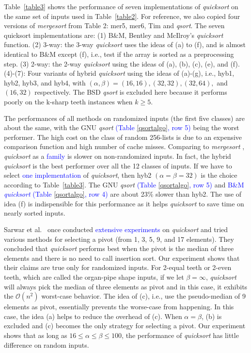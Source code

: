 \documentclass[AMA,STIX1COL]{WileyNJD-v2}
\newcommand{\qusort}{\emph{quicksort }}
\newcommand{\qusortn}{\emph{quicksort}}
\newcommand{\qsort}{\emph{qsort }}
\newcommand{\qsortn}{\emph{qsort}}
\newcommand{\msort}{\emph{mergesort }}
\begin{document}
Table~\ref{table3} shows the performance of seven implementations of \qusort on the same set of inputs used in Table~\ref{table2}. 
For reference, we also copied four versions of \msort from Table 2: mer5, mer6, Tim and \qsortn. 
The seven quicksort implementations are: (1) B\&M, Bentley and McIlroy’s \qusort function. (2) 3-way: the 3-way \qusort uses the ideas of (a) to (f), and is almost identical to B\&M except (f), i.e., test if the array is sorted as a preprocessing step. (3) 2-way: the 2-way \qusort using the ideas of (a), (b), (c), (e), and (f). (4)-(7): Four variants of hybrid \qusort using the ideas of (a)-(g), i.e., hyb1, hyb2, hyb3, and hyb4, with $(\alpha, \beta) = (16, 16), (32, 32), (32, 64),$ and $(16, 32)$ respectively. 
The BSD \qsort is excluded here because it performs poorly on the k-sharp teeth instances when $k \geq 5$.

The performances of all methods on randomized inputs (the first five classes) are about the same, with the GNU \qsort \textcolor{blue}{(Table \ref{qsortalgo}, row 5)} being the worst performer. 
The high cost on the class of random 256-lists is due to an expensive comparison function and high number of cache misses. 
Comparing to \msort, \qusort as a \textcolor{blue}{family} is slower on non-randomized inputs. 
In fact, the hybrid \qusort is the best performer over all the 12 classes of inputs. 
If we have to select \textcolor{blue}{one implementation} of \qusortn, then hyb2 $(\alpha = \beta = 32)$ is the choice according to Table~\ref{table3}. 
The GNU \qsort \textcolor{blue}{(Table \ref{qsortalgo}, row 5)} and \textcolor{blue}{B\&M \qusort (Table \ref{qsortalgo}, row 4)} are about 23\% slower than hyb2. 
The use of idea (f) is indispensible for this performance as it helps \qusort to save time on nearly sorted inputs. 

Sarwar et al.~\cite{sarwar1996engineering} once conducted \textcolor{blue}{extensive experiments} on \qusort and tried various methods for selecting a pivot (from 1, 3, 5, 9, and 17 elements). 
They concluded that \qusort performs best when the pivot is the median of three elements and there is no need to call insertion sort. 
Our experiment shows that their claims are true only for randomized inputs. 
For 2-equal teeth or 2-even teeth, which are called the organ-pipe shape inputs, if we let $\beta = \infty$, \qusort will always pick the median of three elements as pivot and in this case, it exhibits the $\mathcal{O}(n^2)$ worst-case behavior. 
The idea of (c), i.e., use the pseudo-median of 9 elements as pivot, essentially prevents the worse-case from happening. 
In this case, the idea (a) helps to reduce the overhead of (c). When $\alpha = \beta$, (b) is excluded and (c) becomes the only strategy for selecting a pivot. 
Our experiment shows that as long as $16 \leq \alpha \leq \beta \leq 100$, the performance of \qusort has little difference on random inputs.
\end{document}
